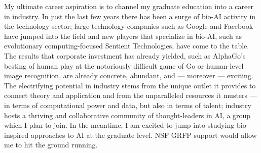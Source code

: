 My ultimate career aspiration is to channel my graduate education into a career in industry.
In just the last few years there has been a surge of bio-AI activity in the technology sector; large technology companies such as Google and Facebook have jumped into the field and new players that specialize in bio-AI, such as evolutionary computing-focused Sentient Technologies, have come to the table.
The results that corporate investment has already yielded, such as AlphaGo's besting of human play at the notoriously difficult game of Go or human-level image recognition, are already concrete, abundant, and --- moreover --- exciting.
The electrifying potential in industry stems from the unique outlet it provides to connect theory and application and from the unparalleled resources it musters --- in terms of computational power and data, but also in terms of talent;
industry hosts a thriving and collaborative community of thought-leaders in AI, a group which I plan to join.
In the meantime, I am excited to jump into studying bio-inspired approaches to AI at the graduate level.
NSF GRFP support would allow me to hit the ground running.
